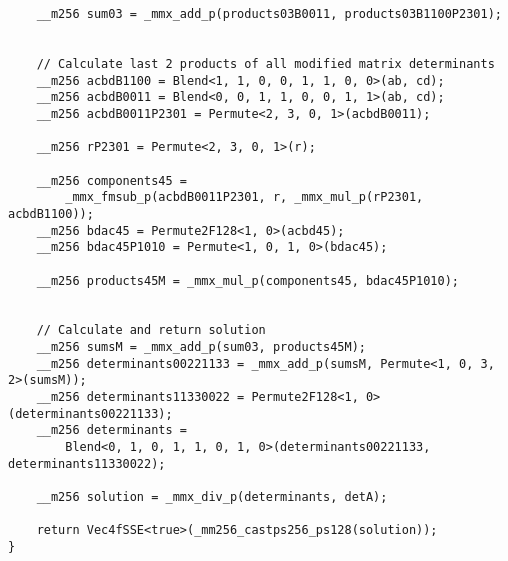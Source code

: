 \begin{verbatim}
    __m256 sum03 = _mmx_add_p(products03B0011, products03B1100P2301);


    // Calculate last 2 products of all modified matrix determinants
    __m256 acbdB1100 = Blend<1, 1, 0, 0, 1, 1, 0, 0>(ab, cd);
    __m256 acbdB0011 = Blend<0, 0, 1, 1, 0, 0, 1, 1>(ab, cd);
    __m256 acbdB0011P2301 = Permute<2, 3, 0, 1>(acbdB0011);

    __m256 rP2301 = Permute<2, 3, 0, 1>(r);

    __m256 components45 = 
        _mmx_fmsub_p(acbdB0011P2301, r, _mmx_mul_p(rP2301, acbdB1100));
    __m256 bdac45 = Permute2F128<1, 0>(acbd45);
    __m256 bdac45P1010 = Permute<1, 0, 1, 0>(bdac45);

    __m256 products45M = _mmx_mul_p(components45, bdac45P1010);


    // Calculate and return solution
    __m256 sumsM = _mmx_add_p(sum03, products45M);
    __m256 determinants00221133 = _mmx_add_p(sumsM, Permute<1, 0, 3, 2>(sumsM));
    __m256 determinants11330022 = Permute2F128<1, 0>(determinants00221133);
    __m256 determinants = 
        Blend<0, 1, 0, 1, 1, 0, 1, 0>(determinants00221133, determinants11330022);

    __m256 solution = _mmx_div_p(determinants, detA);

    return Vec4fSSE<true>(_mm256_castps256_ps128(solution));
}
\end{verbatim}